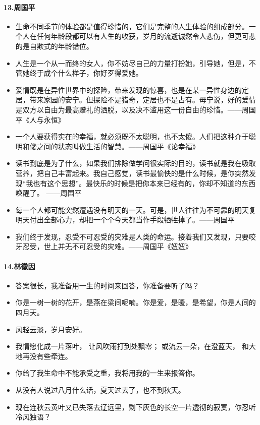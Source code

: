 \documentclass[UTF8,a4paper,8pt]{ctexbook}
\begin{document}
    \paragraph{13.周国平}
	    \begin{itemize}
	    	\item 生命不同季节的体验都是值得珍惜的，它们是完整的人生体验的组成部分。一个人在任何年龄段都可以有人生的收获，岁月的流逝诚然令人悲伤，但更可悲的是自欺式的年龄错位。
	    	\item 人生是一个从一而终的女人，你不妨尽自己的力量打扮她，引导她，但是，不管她终于成个什么样子，你好歹得爱她。
	    	\item 爱情既是在异性世界中的探险，带来发现的惊喜，也是在某一异性身边的定居，带来家园的安宁。但探险不是猎奇，定居也不是占有。毋宁说，好的爱情是双方以自由为最高赠礼的洒脱，以及决不滥用这一份自由的珍惜。——周国平《人与永恒》
	    	\item 一个人要获得实在的幸福，就必须既不太聪明，也不太傻。人们把这种介于聪明和傻之间的状态叫做生活的智慧。——周国平《论幸福》
	    	\item 读书到底是为了什么，如果我们排除做学问很实际的目的，读书就是我在吸取营养，把自己丰富起来。我自己感觉，读书最愉快的是什么时候，是你突然发现“我也有这个思想”。最快乐的时候是把你本来已经有的，你却不知道的东西唤醒了。 ——周国平
	    	\item 每一个人都可能突然遭遇没有明天的一天。可是，世人往往为不可靠的明天复明天付出全部心力，却把一个个今天都当作手段牺牲掉了。——周国平
	    	
	    	\item 我们终于发现，忍受不可忍受的灾难是人类的命运。接着我们又发现，只要咬牙忍受，世上并无不可忍受的灾难。——周国平《妞妞》
	    \end{itemize}
	    
	\paragraph{14.林徽因}
		\begin{itemize}
			\item  答案很长，我准备用一生的时间来回答，你准备要听了吗？
			\item  你是一树一树的花开，是燕在梁间呢喃。你是爱，是暖，是希望，你是人间的四月天。
			\item  风轻云淡，岁月安好。
			\item  我情愿化成一片落叶， 让风吹雨打到处飘零； 或流云一朵，在澄蓝天， 和大地再没有些牵连。
			\item  你给了我生命中不能承受之重，我将用我的一生来报答你。
			\item  从没有人说过八月什么话，夏天过去了，也不到秋天。
			\item  现在连秋云黄叶又已失落去辽远里，剩下灰色的长空一片透彻的寂寞，你忍听冷风独语？
		\end{itemize}
		
\end{document}
